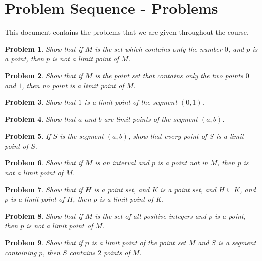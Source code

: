 \documentclass{article}
\newtheorem{problem}{Problem}
\begin{document}
\section*{Problem Sequence - Problems}
This document contains the problems that we are given throughout the course.

\begin{problem}
Show that if $M$ is the set which contains only the number $0$, and $p$ is a point, then $p$ is not a limit point of $M$.
\end{problem}

\begin{problem}
Show that if $M$ is the point set that contains only the two points $0$ and $1$, then no point is a limit point of $M$.
\end{problem}

\begin{problem}
Show that $1$ is a limit point of the segment $(0, 1)$.
\end{problem}

\begin{problem}
Show that $a$ and $b$ are limit points of the segment $(a, b)$.
\end{problem}

\begin{problem}
If $S$ is the segment $(a, b)$, show that every point of $S$ is a limit point of $S$.
\end{problem}

\begin{problem}
Show that if $M$ is an interval and $p$ is a point not in $M$, then $p$ is not a limit point of $M$.
\end{problem}

\begin{problem}
Show that if $H$ is a point set, and $K$ is a point set, and $H \subseteq K$, and $p$ is a limit point of $H$, then $p$ is a limit point of $K$.
\end{problem}

\begin{problem}
Show that if $M$ is the set of all positive integers and $p$ is a point, then $p$ is not a limit point of $M$.
\end{problem}

\begin{problem}
Show that if $p$ is a limit point of the point set $M$ and $S$ is a segment containing $p$, then $S$ contains $2$ points of $M$.
\end{problem}
\end{document}
